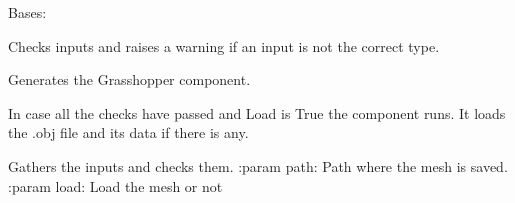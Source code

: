\documentclass[letterpaper,10pt,english]{sphinxmanual}
\begin{document}
\begin{fulllineitems}
\label{\detokenize{geometry:livestock.components.geometry.LoadMesh}}
Bases: {\hyperref[\detokenize{superclass:livestock.components.component.GHComponent}]{}}

\begin{fulllineitems}
\label{\detokenize{geometry:livestock.components.geometry.LoadMesh.check_inputs}}
Checks inputs and raises a warning if an input is not the correct type.

\end{fulllineitems}


\begin{fulllineitems}
\label{\detokenize{geometry:livestock.components.geometry.LoadMesh.config}}
Generates the Grasshopper component.

\end{fulllineitems}


\begin{fulllineitems}
\label{\detokenize{geometry:livestock.components.geometry.LoadMesh.run}}
In case all the checks have passed and Load is True the component runs.
It loads the .obj file and its data if there is any.

\end{fulllineitems}


\begin{fulllineitems}
\label{\detokenize{geometry:livestock.components.geometry.LoadMesh.run_checks}}
Gathers the inputs and checks them.
:param path: Path where the mesh is saved.
:param load: Load the mesh or not

\end{fulllineitems}


\end{fulllineitems}
\end{document}
